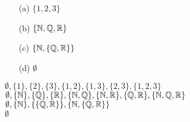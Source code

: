 
\begin{itemize}
  \item[(a)] $\{1, 2, 3\}$
  \item[(b)] $\{\mathbb{N}, \mathbb{Q}, \mathbb{R}\}$
  \item[(c)] $\{\mathbb{N}, \{\mathbb{Q}, \mathbb{R} \}\}$
  \item[(d)] $\emptyset$
\end{itemize}

\noindent
\Ans[(a)] $\emptyset, \{1\}, \{2\}, \{3\}, \{1, 2\}, \{1, 3\}, \{2, 3\}, \{1, 2, 3\}$ \\
\Ans[(b)] $\emptyset, \{\mathbb{N}\}, \{\mathbb{Q}\}, \{\mathbb{R}\}, \{\mathbb{N}, \mathbb{Q}\}, \{\mathbb{N}, \mathbb{R}\}, \{\mathbb{Q}, \mathbb{R}\}, \{\mathbb{N}, \mathbb{Q}, \mathbb{R}\}$ \\
\Ans[(c)] $\emptyset, \{\mathbb{N}\}, \{\{\mathbb{Q}, \mathbb{R}\}\}, \{\mathbb{N}, \{\mathbb{Q}, \mathbb{R}\}\}$ \\
\Ans[(d)] $\emptyset$
